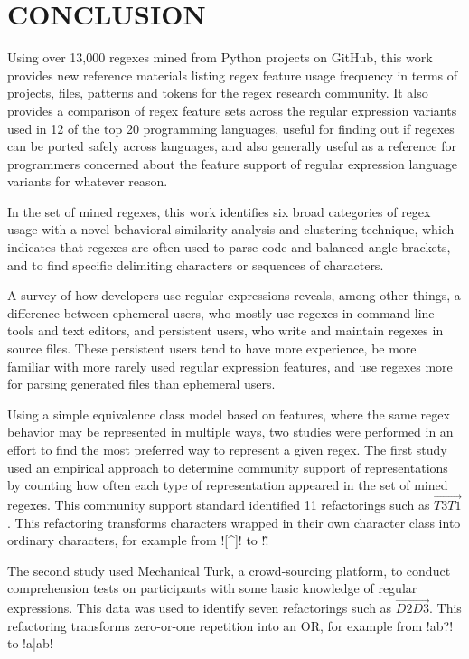 \chapter{CONCLUSION}

Using over 13,000 regexes mined from Python projects on GitHub, this work provides new reference materials listing regex feature usage frequency in terms of projects, files, patterns and tokens for the regex research community.  It also provides a comparison of regex feature sets across the regular expression variants used in 12 of the top 20 programming languages, useful for finding out if regexes can be ported safely across languages, and also generally useful as a reference for programmers concerned about the feature support of regular expression language variants for whatever reason.

In the set of mined regexes, this work identifies six broad categories of regex usage with a novel behavioral similarity analysis and clustering technique, which indicates that regexes are often used to parse code and balanced angle brackets, and to find specific delimiting characters or sequences of characters.

A survey of how developers use regular expressions reveals, among other things, a difference between ephemeral users, who mostly use regexes in command line tools and text editors, and persistent users, who write and maintain regexes in source files.  These persistent users tend to have more experience, be more familiar with more rarely used regular expression features, and use regexes more for parsing generated files than ephemeral users.

Using a simple equivalence class model based on features, where the same regex behavior may be represented in multiple ways, two studies were performed in an effort to find the most preferred way to represent a given regex.  The first study used an empirical approach to determine community support of representations by counting how often each type of representation appeared in the set of mined regexes.  This community support standard identified 11 refactorings such as $\overrightarrow{T3 T1}$.  This refactoring transforms characters wrapped in their own character class into ordinary characters, for example from \cverb![^]! to \cverb!\^!

The second study used Mechanical Turk, a crowd-sourcing platform, to conduct comprehension tests on participants with some basic knowledge of regular expressions.  This data was used to identify seven refactorings such as $\overrightarrow{D2 D3}$.  This refactoring transforms zero-or-one repetition into an OR, for example from \cverb!ab?! to \cverb!a|ab!


